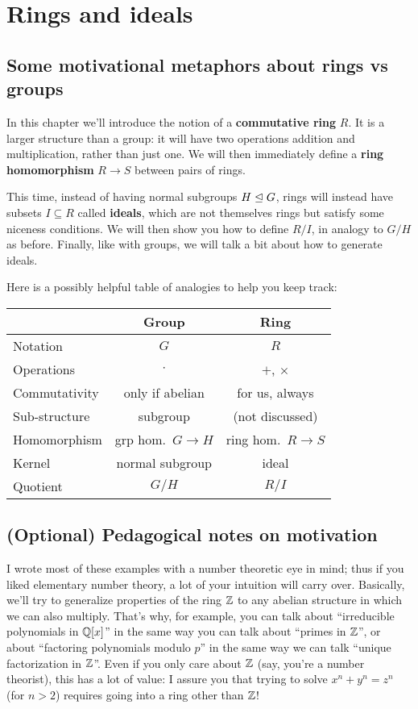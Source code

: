 \chapter{Rings and ideals}
\section{Some motivational metaphors about rings vs groups}
In this chapter we'll introduce the notion of
a \textbf{commutative ring} $R$.
It is a larger structure than a group:
it will have two operations addition and multiplication,
rather than just one.
We will then immediately define a \textbf{ring homomorphism}
$R \to S$ between pairs of rings.

This time, instead of having normal subgroups $H \trianglelefteq G$,
rings will instead have subsets $I \subseteq R$ called \textbf{ideals},
which are not themselves rings but satisfy some niceness conditions.
We will then show you how to define $R/I$,
in analogy to $G/H$ as before.
Finally, like with groups, we will talk a bit about how to generate ideals.

Here is a possibly helpful table of analogies to help you keep track:
\begin{center}
	\begin{tabular}[h]{lcc}
		& Group & Ring \\
		\hline
		Notation & $G$ & $R$ \\
		Operations & $\cdot$ & $+$, $\times$ \\
		Commutativity & only if abelian & for us, always \\
		Sub-structure & subgroup & (not discussed) \\
		Homomorphism & grp hom.\ $G \to H$ & ring hom.\ $R \to S$ \\
		Kernel & normal subgroup & ideal \\
		Quotient & $G/H$ & $R/I$ \\
	\end{tabular}
\end{center}

\section{(Optional) Pedagogical notes on motivation}
I wrote most of these examples with a number theoretic eye in mind;
thus if you liked elementary number theory,
a lot of your intuition will carry over.
Basically, we'll try to generalize properties of the ring $\mathbb Z$ to
any abelian structure in which we can also multiply.
That's why, for example, you can talk about
``irreducible polynomials in $\mathbb Q[x]$'' in the same
way you can talk about ``primes in $\mathbb Z$'',
or about ``factoring polynomials modulo $p$''
in the same way we can talk ``unique factorization in $\mathbb Z$''.
Even if you only care about $\mathbb Z$
(say, you're a number theorist), this has a lot of value:
I assure you that trying to solve $x^n+y^n = z^n$ (for $n > 2$)
requires going into a ring other than $\mathbb Z$!

